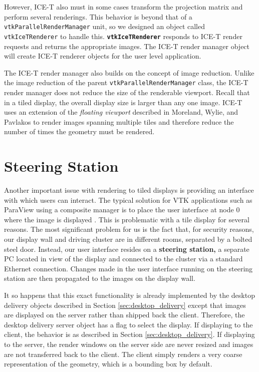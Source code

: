 \documentclass[letterpaper]{acmsiggraph}
\newcommand{\cidentifier}[1]{\texttt{#1}}
\newcommand{\keyterm}[1]{\textbf{#1}}
\begin{document}
  However, ICE-T also must in some cases transform the projection matrix
  and perform several renderings.  This behavior is beyond that of a
  \cidentifier{vtk\-Parallel\-Render\-Manager} unit, so we designed an
  object called \cidentifier{vtk\-Ice\-T\-Renderer} to handle this.
  \keyterm{\cidentifier{vtk\-Ice\-T\-Renderer}} responds to ICE-T render
  requests and returns the appropriate images.  The ICE-T render manager
  object will create ICE-T renderer objects for the user level application.

  The ICE-T render manager also builds on the concept of image reduction.
  Unlike the image reduction of the parent
  \cidentifier{vtk\-Parallel\-Render\-Manager} class, the ICE-T render
  manager does not reduce the size of the renderable viewport.  Recall that
  in a tiled display, the overall display size is larger than any one
  image.  ICE-T uses an extension of the \emph{floating viewport} described
  in Moreland, Wylie, and Pavlakos \cite{Moreland01} to render images
  spanning multiple tiles and therefore reduce the number of times the
  geometry must be rendered.


  \section{Steering Station}
  \label{sec:steering_station}

  Another important issue with rendering to tiled displays is providing an
  interface with which users can interact.  The typical solution for VTK
  applications such as ParaView using a composite manager is to place the
  user interface at node 0 where the image is displayed \cite{Law01}.  This
  is problematic with a tile display for several reasons.  The most
  significant problem for us is the fact that, for security reasons, our
  display wall and driving cluster are in different rooms, separated by a
  bolted steel door.  Instead, our user interface resides on a
  \keyterm{steering station,} a separate PC located in view of the display
  and connected to the cluster via a standard Ethernet connection.  Changes
  made in the user interface running on the steering station are then
  propagated to the images on the display wall.

  It so happens that this exact functionality is already implemented by the
  desktop delivery objects described in Section \ref{sec:desktop_delivery}
  except that images are displayed on the server rather than shipped back
  the client.  Therefore, the desktop delivery server object has a flag to
  select the display.  If displaying to the client, the behavior is as
  described in Section \ref{sec:desktop_delivery}.  If displaying to the
  server, the render windows on the server side are never resized and
  images are not transferred back to the client.  The client simply renders
  a very coarse representation of the geometry, which is a bounding box by
  default.
\end{document}
